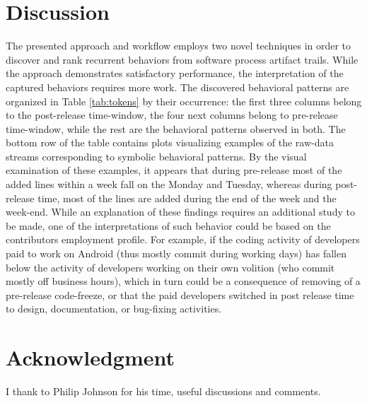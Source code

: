 \documentclass[conference]{worldcomp}
\begin{document}
\section{Discussion}
The presented approach and workflow employs two novel techniques in order to discover and 
rank recurrent behaviors from software process artifact trails. While the approach 
demonstrates satisfactory performance, the interpretation of the captured behaviors requires
more work. 
The discovered behavioral patterns are organized in Table \ref{tab:tokens} by their 
occurrence: the first three columns belong to the post-release time-window, the four next 
columns belong to pre-release time-window, while the rest are the behavioral patterns observed 
in both. 
The bottom row of the table contains plots visualizing examples of the raw-data streams 
corresponding to symbolic behavioral patterns. By the visual examination of these examples, 
it appears that during pre-release most of the added lines within a week fall on the 
Monday and Tuesday, whereas during post-release time, most of the lines are added during the 
end of the week and the week-end. While an explanation of these findings requires an additional
study to be made, one of the interpretations of such behavior could be based on the 
contributors employment profile. For example, if the coding activity of developers paid 
to work on Android (thus mostly commit during working days) has fallen below the activity of 
developers working on their own volition (who commit mostly off business hours), which in turn 
could be a consequence of removing of a pre-release code-freeze, or that the paid developers 
switched in post release time to design, documentation, or bug-fixing activities.

\section{Acknowledgment}
I thank to Philip Johnson for his time, useful discussions and comments.

%
%
\end{document}

